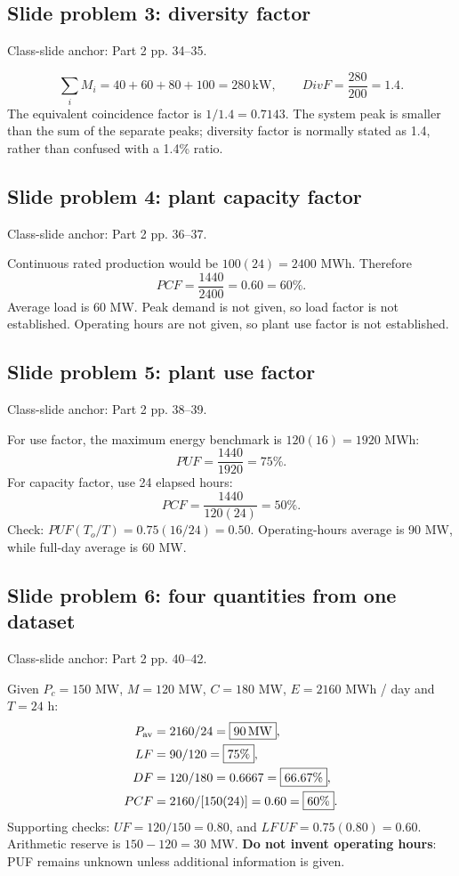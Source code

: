 \documentclass[11pt,a4paper]{article}
\newenvironment{Worked}[1]{\begin{tcolorbox}[breakable=false,colback=white,colframe=teal,colbacktitle=pale,coltitle=ink,title={#1}]}{\end{tcolorbox}}
\newcommand{\slides}[1]{{\small\color{muted}\textsf{Class-slide anchor: #1.}}\par}
\begin{document}
\subsection{Slide problem 3: diversity factor}
\slides{Part 2 pp. 34--35}
\begin{Worked}{Given: individual peaks 40, 60, 80, 100 kW; system peak 200 kW}
\[
\sum_i M_i=40+60+80+100=280\,\mathrm{kW},\qquad
DivF=\frac{280}{200}=\boxed{1.4}.
\]
The equivalent coincidence factor is $1/1.4=0.7143$. The system peak is smaller than the sum of the separate peaks; diversity factor is normally stated as 1.4, rather than confused with a 1.4\% ratio.
\end{Worked}

\subsection{Slide problem 4: plant capacity factor}
\slides{Part 2 pp. 36--37}
\begin{Worked}{Given: $P_c=100$ MW, $E=1440$ MWh in one day}
Continuous rated production would be $100(24)=2400$ MWh. Therefore
\[
PCF=\frac{1440}{2400}=0.60=\boxed{60\%}.
\]
Average load is 60 MW. Peak demand is not given, so load factor is not established. Operating hours are not given, so plant use factor is not established.
\end{Worked}

\subsection{Slide problem 5: plant use factor}
\slides{Part 2 pp. 38--39}
\begin{Worked}{Given: $P_c=120$ MW, $T_o=16$ h / day, $E=1440$ MWh / day}
For use factor, the maximum energy benchmark is $120(16)=1920$ MWh:
\[
PUF=\frac{1440}{1920}=\boxed{75\%}.
\]
For capacity factor, use 24 elapsed hours:
\[
PCF=\frac{1440}{120(24)}=\boxed{50\%}.
\]
Check: $PUF(T_o / T)=0.75(16/24)=0.50$. Operating-hours average is 90 MW, while full-day average is 60 MW.
\end{Worked}

\subsection{Slide problem 6: four quantities from one dataset}
\slides{Part 2 pp. 40--42}
Given $P_c=150$ MW, $M=120$ MW, $C=180$ MW, $E=2160$ MWh / day and $T=24$ h:
\begin{align*}
P_{\rm av}&=2160/24=\boxed{90\,\mathrm{MW}},\\
LF&=90/120=\boxed{75\%},\\
DF&=120/180=0.6667=\boxed{66.67\%},\\
PCF&=2160/[150(24)]=0.60=\boxed{60\%}.
\end{align*}
Supporting checks: $UF=120/150=0.80$, and $LF\,UF=0.75(0.80)=0.60$. Arithmetic reserve is $150-120=30$ MW. \textbf{Do not invent operating hours}: PUF remains unknown unless additional information is given.
\end{document}
